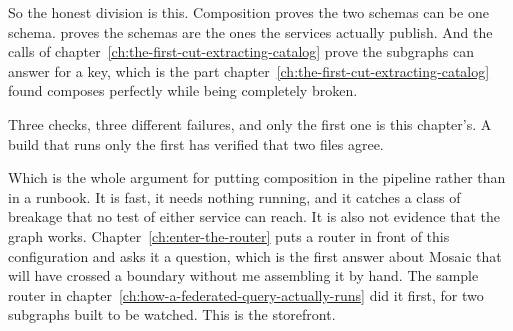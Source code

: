 So the honest division is this. Composition proves the two schemas can be one
schema.  proves the schemas are the ones the services actually
publish. And the  calls of
chapter~\ref{ch:the-first-cut-extracting-catalog} prove the subgraphs can answer
for a key, which is the part
chapter~\ref{ch:the-first-cut-extracting-catalog} found composes perfectly while
being completely broken.

Three checks, three different failures, and only the first one is this chapter's.
A build that runs only the first has verified that two files agree.

\medskip
Which is the whole argument for putting composition in the pipeline rather than
in a runbook. It is fast, it needs nothing running, and it catches a class of
breakage that no test of either service can reach. It is also not evidence that
the graph works.
Chapter~\ref{ch:enter-the-router} puts a router in front of this configuration
and asks it a question, which is the first answer about Mosaic that will have
crossed a boundary without me assembling it by hand. The sample router in
chapter~\ref{ch:how-a-federated-query-actually-runs} did it first, for two
subgraphs built to be watched. This is the storefront.

%

